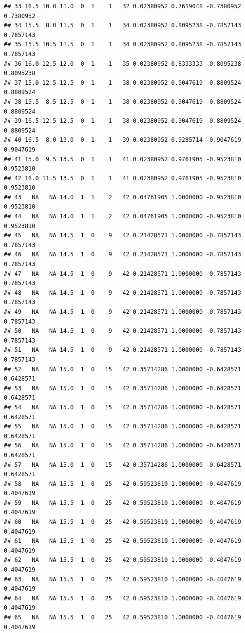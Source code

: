 \documentclass[
  12pt,
]{article}
\begin{document}
\begin{verbatim}
## 33 16.5 10.0 11.0  0  1    1   32 0.02380952 0.7619048 -0.7380952 0.7380952
## 34 15.5  8.0 11.5  0  1    1   34 0.02380952 0.8095238 -0.7857143 0.7857143
## 35 15.5 10.5 11.5  0  1    1   34 0.02380952 0.8095238 -0.7857143 0.7857143
## 36 16.0 12.5 12.0  0  1    1   35 0.02380952 0.8333333 -0.8095238 0.8095238
## 37 15.0 12.5 12.5  0  1    1   38 0.02380952 0.9047619 -0.8809524 0.8809524
## 38 15.5  8.5 12.5  0  1    1   38 0.02380952 0.9047619 -0.8809524 0.8809524
## 39 16.5 12.5 12.5  0  1    1   38 0.02380952 0.9047619 -0.8809524 0.8809524
## 40 16.5  8.0 13.0  0  1    1   39 0.02380952 0.9285714 -0.9047619 0.9047619
## 41 15.0  9.5 13.5  0  1    1   41 0.02380952 0.9761905 -0.9523810 0.9523810
## 42 16.0 11.5 13.5  0  1    1   41 0.02380952 0.9761905 -0.9523810 0.9523810
## 43   NA   NA 14.0  1  1    2   42 0.04761905 1.0000000 -0.9523810 0.9523810
## 44   NA   NA 14.0  1  1    2   42 0.04761905 1.0000000 -0.9523810 0.9523810
## 45   NA   NA 14.5  1  0    9   42 0.21428571 1.0000000 -0.7857143 0.7857143
## 46   NA   NA 14.5  1  0    9   42 0.21428571 1.0000000 -0.7857143 0.7857143
## 47   NA   NA 14.5  1  0    9   42 0.21428571 1.0000000 -0.7857143 0.7857143
## 48   NA   NA 14.5  1  0    9   42 0.21428571 1.0000000 -0.7857143 0.7857143
## 49   NA   NA 14.5  1  0    9   42 0.21428571 1.0000000 -0.7857143 0.7857143
## 50   NA   NA 14.5  1  0    9   42 0.21428571 1.0000000 -0.7857143 0.7857143
## 51   NA   NA 14.5  1  0    9   42 0.21428571 1.0000000 -0.7857143 0.7857143
## 52   NA   NA 15.0  1  0   15   42 0.35714286 1.0000000 -0.6428571 0.6428571
## 53   NA   NA 15.0  1  0   15   42 0.35714286 1.0000000 -0.6428571 0.6428571
## 54   NA   NA 15.0  1  0   15   42 0.35714286 1.0000000 -0.6428571 0.6428571
## 55   NA   NA 15.0  1  0   15   42 0.35714286 1.0000000 -0.6428571 0.6428571
## 56   NA   NA 15.0  1  0   15   42 0.35714286 1.0000000 -0.6428571 0.6428571
## 57   NA   NA 15.0  1  0   15   42 0.35714286 1.0000000 -0.6428571 0.6428571
## 58   NA   NA 15.5  1  0   25   42 0.59523810 1.0000000 -0.4047619 0.4047619
## 59   NA   NA 15.5  1  0   25   42 0.59523810 1.0000000 -0.4047619 0.4047619
## 60   NA   NA 15.5  1  0   25   42 0.59523810 1.0000000 -0.4047619 0.4047619
## 61   NA   NA 15.5  1  0   25   42 0.59523810 1.0000000 -0.4047619 0.4047619
## 62   NA   NA 15.5  1  0   25   42 0.59523810 1.0000000 -0.4047619 0.4047619
## 63   NA   NA 15.5  1  0   25   42 0.59523810 1.0000000 -0.4047619 0.4047619
## 64   NA   NA 15.5  1  0   25   42 0.59523810 1.0000000 -0.4047619 0.4047619
## 65   NA   NA 15.5  1  0   25   42 0.59523810 1.0000000 -0.4047619 0.4047619

\end{verbatim}
\end{document}
